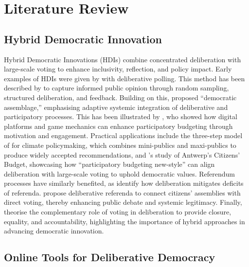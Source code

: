 \section{Literature Review}
\subsection{Hybrid Democratic Innovation}

Hybrid Democratic Innovations (HDIs) combine concentrated deliberation with large-scale voting \cite{hendriks2024} to enhance inclusivity, reflection, and policy impact. Early examples of HDIs were given by \citet{fishkin1991} with deliberative polling. This method has been described by \citet{mansbridge2010} to capture informed public opinion through random sampling, structured deliberation, and feedback. Building on this, \citet{felicetti2021} proposed \enquote{democratic assemblage,} emphasising adaptive systemic integration of deliberative and participatory processes. This has been illustrated by \citet{gastil2021}, who showed how digital platforms and game mechanics can enhance participatory budgeting through motivation and engagement. Practical applications include the three-step model of \citet{Itten2022} for climate policymaking, which combines mini-publics and maxi-publics to produce widely accepted recommendations, and \citet{hendriks2024}’s study of Antwerp’s Citizens’ Budget, showcasing how \enquote{participatory budgeting new-style} can align deliberation with large-scale voting to uphold democratic values. Referendum processes have similarly benefited, as \citet{witting2023} identify how deliberation mitigates deficits of referenda. \citet{hendriks2023} propose deliberative referenda to connect citizens’ assemblies with direct voting, thereby enhancing public debate and systemic legitimacy. Finally, \citet{chambers2023} theorise the complementary role of voting in deliberation to provide closure, equality, and accountability, highlighting the importance of hybrid approaches in advancing democratic innovation.

\subsection{Online Tools for Deliberative Democracy}

